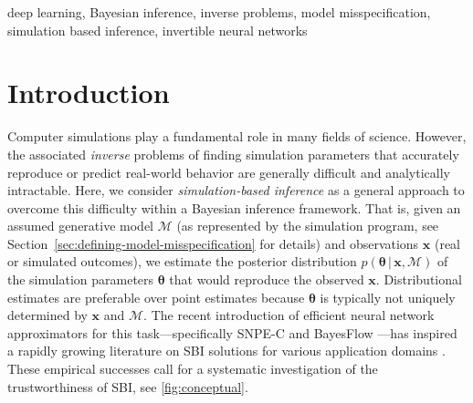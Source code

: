 \documentclass[twoside,11pt]{article}
\newcommand{\x}{\boldsymbol{x}}
\newcommand{\thetab}{\boldsymbol{\theta}}
\newcommand{\0}{\boldsymbol{0}}
\newcommand{\given}{\,|\,}
\renewcommand{\cite}[1]{\citep{#1}}
\begin{document}
\begin{keywords}
  deep learning, Bayesian inference, inverse problems, model misspecification, simulation based inference, invertible neural networks
\end{keywords}

\section{Introduction}
Computer simulations play a fundamental role in many fields of science. 
However, the associated {\em inverse} problems of finding simulation parameters that accurately reproduce or predict real-world behavior are generally difficult and analytically intractable.
Here, we consider \emph{simulation-based inference} \citep[SBI;][]{frontier} as a general approach to overcome this difficulty within a Bayesian inference framework.
That is, given an assumed generative model $\mathcal{M}$ (as represented by the simulation program, see Section~\ref{sec:defining-model-misspecification} for details) and observations $\x$ (real or simulated outcomes), we estimate the posterior distribution $p(\thetab\given\x,\mathcal{M})$ of the simulation parameters $\thetab$ that would reproduce the observed $\x$.
Distributional estimates are preferable over point estimates because $\thetab$ is typically not uniquely determined by $\x$ and $\mathcal{M}$.
The recent introduction of efficient neural network approximators for this task---specifically SNPE-C \citep[APT;][]{apt} and BayesFlow \cite{bayesflow}---has inspired a rapidly growing literature on SBI solutions for various application domains \citep[e.g.,][]{butter2022machine, lueckmann2021benchmarking, gonccalves2020training,  bayesflow_agent, bayesflow_qcd, von_krause_mental_2022, ghaderi-kangavari_general_2022}.
These empirical successes call for a systematic investigation of the trustworthiness of SBI, see \autoref{fig:conceptual}.
\end{document}
